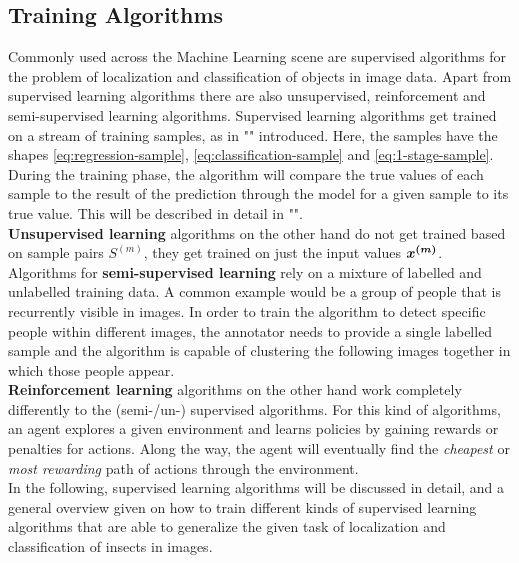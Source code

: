 \subsection{Training Algorithms}\label{subsec:training-algorithms}
Commonly used across the Machine Learning scene are supervised algorithms for the problem of localization and classification of objects in image data. Apart from supervised learning algorithms there are also unsupervised, reinforcement and semi-supervised learning algorithms.
Supervised learning algorithms get trained on a stream of training samples, as in "" introduced.
Here, the samples have the shapes \eqref{eq:regression-sample}, \eqref{eq:classification-sample} and \eqref{eq:1-stage-sample}.
During the training phase, the algorithm will compare the true values of each sample to the result of the prediction through the model for a given sample to its true value. This will be described in detail in "".\\
\textbf{Unsupervised learning} algorithms on the other hand do not get trained based on sample pairs $S^{(m)}$, they get trained on just the input values $\bm{x^{(m)}}$.\\
Algorithms for \textbf{semi-supervised learning} rely on a mixture of labelled and unlabelled training data.
A common example would be a group of people that is recurrently visible in images.
In order to train the algorithm to detect specific people within different images, the annotator needs to provide a single labelled sample and the algorithm is capable of clustering the following images together in which those people appear.\\
\textbf{Reinforcement learning} algorithms on the other hand work completely differently to the (semi-/un-) supervised algorithms.
For this kind of algorithms, an agent explores a given environment and learns policies by gaining rewards or penalties for actions.
Along the way, the agent will eventually find the \textit{cheapest} or \textit{most rewarding} path of actions through the environment.\\
In the following, supervised learning algorithms will be discussed in detail, and a general overview given on how to train different kinds of supervised learning algorithms that are able to generalize the given task of localization and classification of insects in images.

